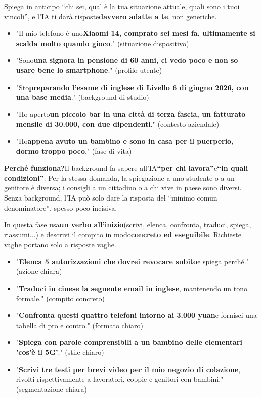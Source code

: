 
Spiega in anticipo “chi sei, qual è la tua situazione attuale, quali sono i tuoi vincoli”, e l'IA ti darà risposte\textbf{davvero adatte a te}, non generiche.


\begin{itemize}
  \item "Il mio telefono è uno\textbf{Xiaomi 14, comprato sei mesi fa, ultimamente si scalda molto quando gioco}." (situazione dispositivo)
  \item "Sono\textbf{una signora in pensione di 60 anni, ci vedo poco e non so usare bene lo smartphone}." (profilo utente)
  \item "Sto\textbf{preparando l'esame di inglese di Livello 6 di giugno 2026, con una base media}." (background di studio)
  \item "Ho aperto\textbf{un piccolo bar in una città di terza fascia, un fatturato mensile di 30.000, con due dipendenti}." (contesto aziendale)
  \item "Ho\textbf{appena avuto un bambino e sono in casa per il puerperio, dormo troppo poco}." (fase di vita)
\end{itemize}

\textbf{Perché funziona?}Il background fa sapere all'IA\textbf{“per chi lavora”}e\textbf{“in quali condizioni”}. Per la stessa domanda, la spiegazione a uno studente o a un genitore è diversa; i consigli a un cittadino o a chi vive in paese sono diversi. Senza background, l'IA può solo dare la risposta del “minimo comun denominatore”, spesso poco incisiva.


In questa fase usa\textbf{un verbo all'inizio}(scrivi, elenca, confronta, traduci, spiega, riassumi...) e descrivi il compito in modo\textbf{concreto ed eseguibile}. Richieste vaghe portano solo a risposte vaghe.


\begin{itemize}
  \item "\textbf{Elenca 5 autorizzazioni che dovrei revocare subito}e spiega perché." (azione chiara)
  \item "\textbf{Traduci in cinese la seguente email in inglese}, mantenendo un tono formale." (compito concreto)
  \item "\textbf{Confronta questi quattro telefoni intorno ai 3.000 yuan}e fornisci una tabella di pro e contro." (formato chiaro)
  \item "\textbf{Spiega con parole comprensibili a un bambino delle elementari 'cos'è il 5G'}." (stile chiaro)
  \item "\textbf{Scrivi tre testi per brevi video per il mio negozio di colazione}, rivolti rispettivamente a lavoratori, coppie e genitori con bambini." (segmentazione chiara)
\end{itemize}

